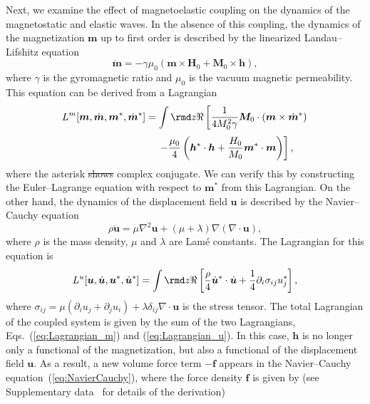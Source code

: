 \documentclass[10pt]{iopart}
\providecommand{\DIFaddtex}[1]{{\protect\color{blue}\uwave{#1}}} %
\providecommand{\DIFdeltex}[1]{{\protect\color{red}\sout{#1}}}                      %
\providecommand{\DIFaddbegin}{} %
\providecommand{\DIFaddend}{} %
\providecommand{\DIFdelbegin}{} %
\providecommand{\DIFdelend}{} %
\providecommand{\DIFadd}[1]{\texorpdfstring{\DIFaddtex{#1}}{#1}} %
\providecommand{\DIFdel}[1]{\texorpdfstring{\DIFdeltex{#1}}{}} %
\newcommand{\DIFscaledelfig}{0.5}
\newlength{\DIFdelgraphicswidth} %
\newlength{\DIFdelgraphicsheight} %
\newcommand{\DIFaddincludegraphics}[2][]{{\color{blue}\fbox{\DIFOincludegraphics[#1]{#2}}}} %
\newcommand{\DIFdelincludegraphics}[2][]{%
\sbox{\DIFdelgraphicsbox}{\DIFOincludegraphics[#1]{#2}}%
\settoboxwidth{\DIFdelgraphicswidth}{\DIFdelgraphicsbox} %
\settoboxtotalheight{\DIFdelgraphicsheight}{\DIFdelgraphicsbox} %
\scalebox{\DIFscaledelfig}{%
\parbox[b]{\DIFdelgraphicswidth}{\usebox{\DIFdelgraphicsbox}\\[-\baselineskip] \rule{\DIFdelgraphicswidth}{0em}}\llap{\resizebox{\DIFdelgraphicswidth}{\DIFdelgraphicsheight}{%
\setlength{\unitlength}{\DIFdelgraphicswidth}%
\begin{picture}(1,1)%
\thicklines\linethickness{2pt} %
{\color[rgb]{1,0,0}\put(0,0){\framebox(1,1){}}}%
{\color[rgb]{1,0,0}\put(0,0){\line( 1,1){1}}}%
{\color[rgb]{1,0,0}\put(0,1){\line(1,-1){1}}}%
\end{picture}%
}\hspace*{3pt}}} %
} %
\DeclareRobustCommand{\DIFaddbegin}{\DIFOaddbegin \let\includegraphics\DIFaddincludegraphics} %
\DeclareRobustCommand{\DIFaddend}{\DIFOaddend \let\includegraphics\DIFOincludegraphics} %
\DeclareRobustCommand{\DIFdelbegin}{\DIFOdelbegin \let\includegraphics\DIFdelincludegraphics} %
\DeclareRobustCommand{\DIFdelend}{\DIFOaddend \let\includegraphics\DIFOincludegraphics} %
\begin{document}
Next, we examine the effect of magnetoelastic coupling on the dynamics of the magnetostatic and elastic waves. In the absence of this coupling, the dynamics of the magnetization $\bm{m}$ up to first order is described by the linearized Landau--Lifshitz equation
\begin{equation}
    \dot{\bm{m}}=-\gamma\mu_0\left(\bm{m}\times\bm{H}_0+\bm{M}_0\times\bm{h}\right),\label{eq:LandauLifshitz}
\end{equation}
where $\gamma$ is the gyromagnetic ratio and $\mu_0$ is the vacuum magnetic permeability. This equation can be derived from a Lagrangian
\begin{equation*}
    L^m[\bm{m},\dot{\bm{m}},\bm{m}^*,\dot{\bm{m}}^*]=\int\rmd z\Re\left[\frac{1}{4M_0^2\gamma}\bm{M}_0\cdot(\bm{m}\times\dot{\bm{m}}^*)\right.
\end{equation*}
\begin{equation}
    \hspace{2.9cm}\left.-\frac{\mu_0}{4}\left(\bm{h}^*\cdot\bm{h}+\frac{H_0}{M_0}\bm{m}^*\cdot\bm{m}\right)\right],\label{eq:Lagrangian_m}
\end{equation}
where the asterisk \DIFdelbegin \DIFdel{shows }\DIFdelend \DIFaddbegin \DIFadd{denotes }\DIFaddend complex conjugate. We can verify this by constructing the Euler--Lagrange equation with respect to $\bm{m}^*$ from this Lagrangian. On the other hand, the dynamics of the displacement field $\bm{u}$ is described by the Navier--Cauchy equation
\begin{equation}
    \rho\ddot{\bm{u}}=\mu\nabla^2\bm{u}+\left(\mu+\lambda\right)\nabla\left(\nabla\cdot\bm{u}\right),\label{eq:NavierCauchy}
\end{equation}
where $\rho$ is the mass density, $\mu$ and $\lambda$ are Lam\'e constants. The Lagrangian for this equation is
\begin{equation}
    L^u[\bm{u},\dot{\bm{u}},\bm{u}^*,\dot{\bm{u}}^*]=\int\rmd z\Re\left[\frac{\rho}{4}\dot{\bm{u}}^*\cdot\dot{\bm{u}}+\frac{1}{4}\partial_i\sigma_{ij}u_j^*\right],\label{eq:Lagrangian_u}
\end{equation}
where $\sigma_{ij}=\mu(\partial_i u_j+\partial_j u_i)+\lambda\delta_{ij}\nabla\cdot\bm{u}$ is the stress tensor. The total Lagrangian of the coupled system is given by the sum of the two Lagrangians, Eqs.~(\ref{eq:Lagrangian_m}) and (\ref{eq:Lagrangian_u}). In this case, $\bm{h}$ is no longer only a functional of the magnetization, but also a functional of the displacement field $\bm{u}$. As a result, a new volume force term $-\bm{f}$ appears in the Navier--Cauchy equation~(\ref{eq:NavierCauchy}), where the force density $\bm{f}$ is given by (see Supplementary data~\cite{SM} for details of the derivation)
\end{document}
